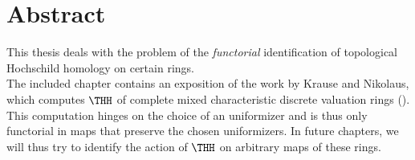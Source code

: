 \chapter*{Abstract}
This thesis deals with the problem of the \textit{functorial} identification of topological Hochschild homology on certain rings. \\
The included chapter contains an exposition of the work by Krause and Nikolaus, which computes $\THH$ of complete mixed characteristic discrete valuation rings (\cite{KNBokstedt}). This computation hinges on the choice of an uniformizer and is thus only functorial in maps that preserve the chosen uniformizers.
In future chapters, we will thus try to identify the action of $\THH$ on arbitrary maps of these rings. 


